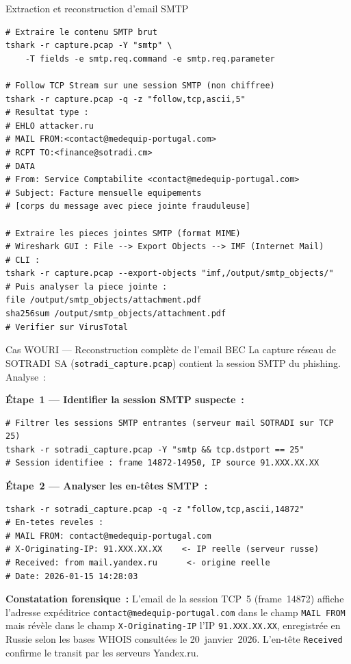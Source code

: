 \begin{boxoutils}{Extraction et reconstruction d'email SMTP}
\begin{lstlisting}[language=bash_forensique]
# Extraire le contenu SMTP brut
tshark -r capture.pcap -Y "smtp" \
    -T fields -e smtp.req.command -e smtp.req.parameter

# Follow TCP Stream sur une session SMTP (non chiffree)
tshark -r capture.pcap -q -z "follow,tcp,ascii,5"
# Resultat type :
# EHLO attacker.ru
# MAIL FROM:<contact@medequip-portugal.com>
# RCPT TO:<finance@sotradi.cm>
# DATA
# From: Service Comptabilite <contact@medequip-portugal.com>
# Subject: Facture mensuelle equipements
# [corps du message avec piece jointe frauduleuse]

# Extraire les pieces jointes SMTP (format MIME)
# Wireshark GUI : File --> Export Objects --> IMF (Internet Mail)
# CLI :
tshark -r capture.pcap --export-objects "imf,/output/smtp_objects/"
# Puis analyser la piece jointe :
file /output/smtp_objects/attachment.pdf
sha256sum /output/smtp_objects/attachment.pdf
# Verifier sur VirusTotal
\end{lstlisting}
\end{boxoutils}

\begin{boxscenario}{Cas WOURI --- Reconstruction complète de l'email BEC}
La capture réseau de SOTRADI~SA (\texttt{sotradi\_capture.pcap})
contient la session SMTP du phishing. Analyse~:

\textbf{Étape~1 --- Identifier la session SMTP suspecte~:}
\begin{lstlisting}[language=bash_forensique]
# Filtrer les sessions SMTP entrantes (serveur mail SOTRADI sur TCP 25)
tshark -r sotradi_capture.pcap -Y "smtp && tcp.dstport == 25"
# Session identifiee : frame 14872-14950, IP source 91.XXX.XX.XX
\end{lstlisting}

\textbf{Étape~2 --- Analyser les en-têtes SMTP~:}
\begin{lstlisting}[language=bash_forensique]
tshark -r sotradi_capture.pcap -q -z "follow,tcp,ascii,14872"
# En-tetes reveles :
# MAIL FROM: contact@medequip-portugal.com
# X-Originating-IP: 91.XXX.XX.XX    <- IP reelle (serveur russe)
# Received: from mail.yandex.ru      <- origine reelle
# Date: 2026-01-15 14:28:03
\end{lstlisting}

\textbf{Constatation forensique~:}
L'email de la session TCP~5 (frame~14872) affiche l'adresse expéditrice
\texttt{contact@medequip-portugal.com} dans le champ \texttt{MAIL FROM}
mais révèle dans le champ \texttt{X-Originating-IP} l'IP
\texttt{91.XXX.XX.XX}, enregistrée en Russie selon les bases WHOIS
consultées le 20~janvier~2026. L'en-tête \texttt{Received} confirme
le transit par les serveurs Yandex.ru.
\end{boxscenario}

